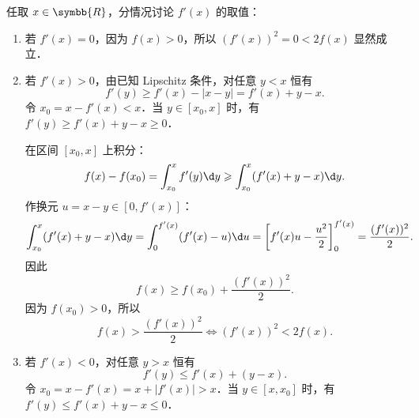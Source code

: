 \begin{myproof}
    任取 $x \in \symbb{R}$，分情况讨论 $f'(x)$ 的取值：
    \begin{enumerate}
        \item 若 $f'(x) = 0$，因为 $f(x) > 0$，所以 $(f'(x))^2 = 0 < 2f(x)$ 显然成立．
        \item 若 $f'(x) > 0$，由已知 Lipschitz 条件，对任意 $y < x$ 恒有
              \begin{equation}
                  f'(y) \geqslant f'(x) - |x - y| = f'(x) + y - x.
              \end{equation}
              令 $x_0 = x - f'(x) < x$．当 $y \in [x_0, x]$ 时，有 $f'(y) \geqslant f'(x) + y - x \geqslant 0$．

              在区间 $[x_0, x]$ 上积分：
              \begin{equation}
                  f(x) - f(x_0) = \int_{x_0}^x f'(y)\d y \geqslant \int_{x_0}^x (f'(x) + y - x)\d y.
              \end{equation}
              作换元 $u = x - y \in [0, f'(x)]$：
              \begin{equation}
                  \int_{x_0}^x (f'(x) + y - x)\d y = \int_0^{f'(x)} (f'(x) - u)\d u = \left[ f'(x)u - \frac{u^2}{2} \right]_0^{f'(x)} = \frac{(f'(x))^2}{2}.
              \end{equation}
              因此
              \begin{equation}
                  f(x) \geqslant f(x_0) + \frac{(f'(x))^2}{2}.
              \end{equation}
              因为 $f(x_0) > 0$，所以
              \begin{equation}
                  f(x) > \frac{(f'(x))^2}{2} \iff (f'(x))^2 < 2f(x).
              \end{equation}
        \item 若 $f'(x) < 0$，对任意 $y > x$ 恒有
              \begin{equation}
                  f'(y) \leqslant f'(x) + (y - x).
              \end{equation}
              令 $x_0 = x - f'(x) = x + |f'(x)| > x$．当 $y \in [x, x_0]$ 时，有 $f'(y) \leqslant f'(x) + y - x \leqslant 0$．


\end{enumerate}
\end{myproof}
